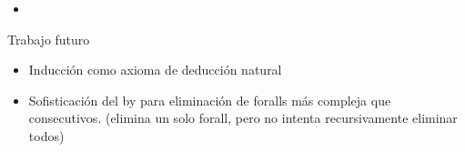 \begin{itemize}
    \item {}
\end{itemize}

Trabajo futuro

\begin{itemize}
    \item Inducción como axioma de deducción natural
    \item Sofisticación del by para eliminación de foralls más compleja que
    consecutivos. (elimina un solo forall, pero no intenta recursivamente
    eliminar todos)
\end{itemize}